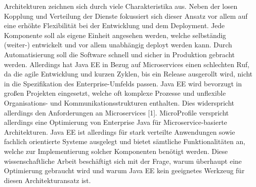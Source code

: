  Architekturen zeichnen sich durch viele Charakteristika aus. Neben der losen Kopplung und Verteilung der Dienste fokussiert sich dieser Ansatz vor allem auf eine erhöhte Flexibilität bei der Entwicklung und dem Deployment. Jede Komponente soll als eigene Einheit angesehen werden, welche selbständig (weiter-) entwickelt und vor allem unabhängig deployt werden kann. Durch Automatisierung soll die Software schnell und sicher in Produktion gebracht werden. Allerdings hat Java EE in Bezug auf Microservices einen schlechten Ruf, da die agile Entwicklung und kurzen Zyklen, bis ein Release ausgerollt wird, nicht in die Spezifikation des Enterprise-Umfelds passen. Java EE wird bevorzugt in großen Projekten eingesetzt, welche oft komplexe Prozesse und unflexible Organisations- und Kommunikationsstrukturen enthalten. Dies widerspricht allerdings den Anforderungen an Microservices [1]. MicroProfile verspricht allerdings eine Optimierung von Enterprise Java für Microservice-basierte Architekturen.
Java EE ist allerdings für stark verteilte Anwendungen sowie fachlich orientierte Systeme ausgelegt und bietet sämtliche Funktionalitäten an, welche zur Implementierung solcher Komponenten benötigt werden. Diese wissenschaftliche Arbeit beschäftigt sich mit der Frage, warum überhaupt eine Optimierung gebraucht wird und warum Java EE kein geeignetes Werkzeug für diesen Architekturansatz ist. 
